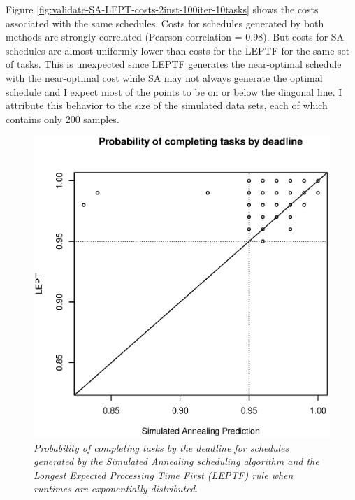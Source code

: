 \documentclass[12pt]{report}
\begin{document}
Figure \ref{fig:validate-SA-LEPT-costs-2inst-100iter-10tasks} shows the costs associated with the same schedules. 
Costs for schedules generated by both methods are strongly correlated (Pearson correlation = 0.98).
But costs for SA schedules are almost uniformly lower than costs for the LEPTF for the same set of tasks.
This is unexpected since LEPTF generates the near-optimal schedule with the near-optimal cost while SA may not always generate the optimal schedule and I expect most of the points to be on or below the diagonal line.
I attribute this behavior to the size of the simulated data sets, each of which contains only 200 samples.

\begin{figure}
\includegraphics[width=1\textwidth]{validate-SA-LEPT-scores-2inst-100iter-10tasks.eps}
\caption{\textit{Probability of completing tasks by the deadline for schedules generated by the Simulated Annealing scheduling algorithm and the Longest Expected Processing Time First (LEPTF) rule when runtimes are exponentially distributed.}}
\label{fig:validate-SA-LEPT-scores-2inst-100iter-10tasks}
\end{figure}
\end{document}
